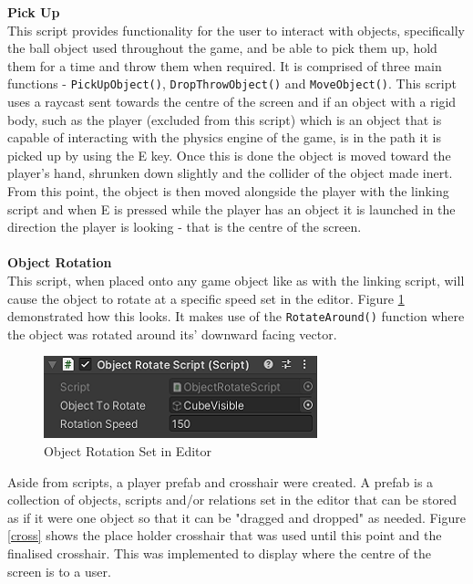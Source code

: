 \noindent \textbf{Pick Up}\\
This script provides functionality for the user to interact with objects, specifically the ball object used throughout the game, and be able to pick them up, hold them for a time and throw them when required. It is comprised of three main functions - \texttt{PickUpObject()}, \texttt{DropThrowObject()} and \texttt{MoveObject()}. This script uses a raycast sent towards the centre of the screen and if an object with a rigid body, such as the player (excluded from this script) which is an object that is capable of interacting with the physics engine of the game, is in the path it is picked up by using the E key. Once this is done the object is moved toward the player's hand, shrunken down slightly and the collider of the object made inert. From this point, the object is then moved alongside the player with the linking script and when E is pressed while the player has an object it is launched in the direction the player is looking - that is the centre of the screen.
\\\\
\textbf{Object Rotation}\\
This script, when placed onto any game object like as with the linking script, will cause the object to rotate at a specific speed set in the editor. Figure \ref{rot} demonstrated how this looks. It makes use of the \texttt{RotateAround()} function where the object was rotated around its' downward facing vector.

\begin{figure}[H]
\centering
\includegraphics[scale=1]{Figures/rot.png}
\caption{Object Rotation Set in Editor}
\label{rot}
\end{figure}

\noindent Aside from scripts, a player prefab and crosshair were created. A prefab is a collection of objects, scripts and/or relations set in the editor that can be stored as if it were one object so that it can be "dragged and dropped" as needed. Figure \ref{cross} shows the place holder crosshair that was used until this point and the finalised crosshair. This was implemented to display where the centre of the screen is to a user.


